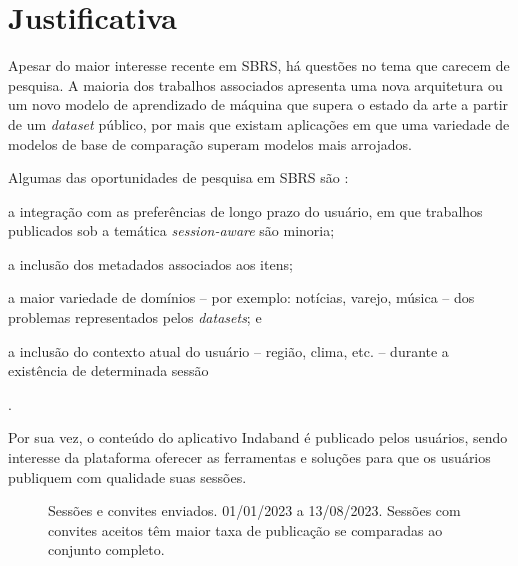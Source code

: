 \section{Justificativa}

Apesar do maior interesse recente em SBRS, há questões no tema que carecem de
 pesquisa. A maioria dos trabalhos associados apresenta uma nova arquitetura ou
 um novo modelo de aprendizado de máquina que supera o estado da arte a partir
 de um \textit{dataset} público, por mais que existam aplicações em que uma
 variedade de modelos de base de comparação superam modelos mais arrojados.

 Algumas das oportunidades de pesquisa em SBRS são \cite{rec_sys_handbook_2022}:
 \begin{inparaenum}[(1)]
     \item a integração com as preferências de longo prazo do usuário, em que
     trabalhos publicados sob a temática \textit{session-aware} são minoria;
     \item a inclusão dos metadados associados aos itens;
     \item a maior variedade de domínios -- por exemplo: notícias, varejo,
     música -- dos problemas representados pelos \textit{datasets}; e
     \item a inclusão do contexto atual do usuário -- região, clima, etc. --
     durante a existência de determinada sessão\end{inparaenum}.
     
Por sua vez, o conteúdo do aplicativo Indaband é publicado pelos
usuários, sendo interesse da plataforma oferecer as ferramentas e soluções para
que os usuários publiquem com qualidade suas sessões.
\vspace{0.2cm}
\begin{figure}[ht]
    \centering
    \hspace{1cm} 
    \caption{Sessões e convites enviados. 01/01/2023 a 13/08/2023. Sessões com convites aceitos têm maior taxa de publicação se comparadas ao conjunto completo.}
    \end{figure}
    \vspace{0.2cm}

